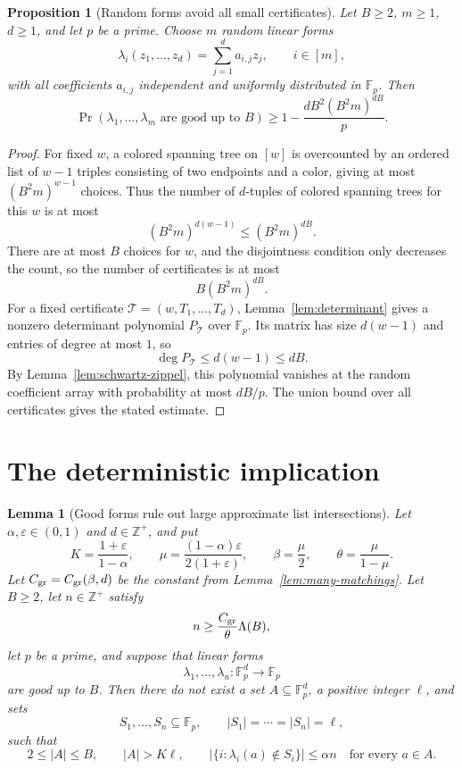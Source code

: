 \documentclass{amsart}
\newtheorem{lemma}[theorem]{Lemma}
\newtheorem{proposition}[theorem]{Proposition}
\theoremstyle{definition}
\theoremstyle{remark}
\newcommand{\Fp}{\mathbb{F}_p}
\newcommand{\Zpos}{\mathbb{Z}^{+}}
\begin{document}
\begin{proposition}[Random forms avoid all small certificates]\label{prop:random-good}
Let \(B\ge2\), \(m\ge1\), \(d\ge1\), and let \(p\) be a prime. Choose \(m\) random linear forms
\[
\lambda_i(z_1,\ldots,z_d)=\sum_{j=1}^d a_{i,j}z_j,
\qquad i\in[m],
\]
with all coefficients \(a_{i,j}\) independent and uniformly distributed in \(\Fp\). Then
\[
\Pr(\lambda_1,\ldots,\lambda_m\text{ are good up to }B)
\ge
1-\frac{dB^2(B^2m)^{dB}}{p}.
\]
\end{proposition}

\begin{proof}
For fixed \(w\), a colored spanning tree on \([w]\) is overcounted by an ordered list of \(w-1\) triples consisting of two endpoints and a color, giving at most \((B^2m)^{w-1}\) choices. Thus the number of \(d\)-tuples of colored spanning trees for this \(w\) is at most
\[
(B^2m)^{d(w-1)}\le(B^2m)^{dB}.
\]
There are at most \(B\) choices for \(w\), and the disjointness condition only decreases the count, so the number of certificates is at most
\[
B(B^2m)^{dB}.
\]
For a fixed certificate \(\mathcal T=(w,T_1,\ldots,T_d)\), Lemma~\ref{lem:determinant} gives a nonzero determinant polynomial \(P_{\mathcal T}\) over \(\Fp\). Its matrix has size \(d(w-1)\) and entries of degree at most \(1\), so
\[
\deg P_{\mathcal T}\le d(w-1)\le dB.
\]
By Lemma~\ref{lem:schwartz-zippel}, this polynomial vanishes at the random coefficient array with probability at most \(dB/p\). The union bound over all certificates gives the stated estimate.
\end{proof}


\section{The deterministic implication}

\begin{lemma}[Good forms rule out large approximate list intersections]\label{lem:deterministic}
Let $\alpha,\varepsilon\in(0,1)$ and $d\in\Zpos$, and put
\[
K=\frac{1+\varepsilon}{1-\alpha},
\qquad
\mu=\frac{(1-\alpha)\varepsilon}{2(1+\varepsilon)},
\qquad
\beta=\frac\mu2,
\qquad
\theta=\frac{\mu}{1-\mu}.
\]
Let $C_{\rm gr}=C_{\rm gr}(\beta,d)$ be the constant from Lemma~\ref{lem:many-matchings}. Let $B\ge2$, let $n\in\Zpos$ satisfy
\[
n\ge \frac{C_{\rm gr}}{\theta}\Lambda(B),
\]
let $p$ be a prime, and suppose that linear forms
\[
\lambda_1,\ldots,\lambda_n:\Fp^d\to\Fp
\]
are good up to $B$. Then there do not exist a set $A\subseteq\Fp^d$, a positive integer $\ell$, and sets
\[
S_1,\ldots,S_n\subseteq\Fp,
\qquad |S_1|=\cdots=|S_n|=\ell,
\]
such that
\[
2\le |A|\le B,
\qquad
|A|>K\ell,
\qquad
\left|\{i:\lambda_i(a)\notin S_i\}\right|\le \alpha n
\quad\text{for every }a\in A.
\]
\end{lemma}
\end{document}
